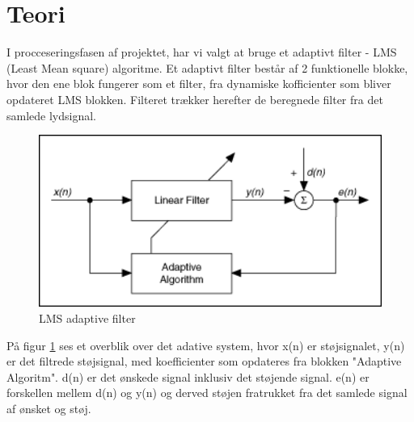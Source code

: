 \section{Teori}
I procceseringsfasen af projektet, har vi valgt at bruge et adaptivt filter - LMS (Least Mean square) algoritme. Et adaptivt filter består af 2 funktionelle blokke, hvor den ene blok fungerer som et filter, fra dynamiske kofficienter som bliver opdateret LMS blokken.  Filteret trækker herefter de beregnede filter fra det samlede lydsignal. 
   

\begin{figure}[H]
	\centering
	\includegraphics[width = 400pt]{Img/Figures}
	\caption{LMS adaptive filter}
	\label{fig:LMS_filter}
\end{figure}

På figur \ref{fig:LMS_filter} ses et overblik over det adative system, hvor x(n) er støjsignalet, y(n) er det filtrede støjsignal, med koefficienter som opdateres fra blokken "Adaptive Algoritm". d(n) er det ønskede signal inklusiv det støjende signal. e(n) er forskellen mellem d(n) og y(n) og derved støjen fratrukket fra det samlede signal af ønsket og støj.  